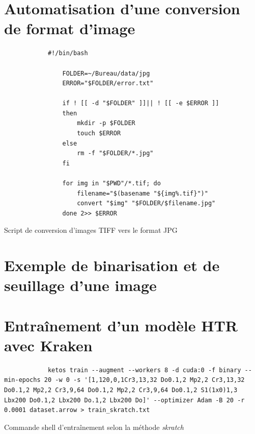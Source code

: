 \chapter{Automatisation d'une conversion de format d'image}
\begin{listing}
	        \begin{verbatim}
	        #!/bin/bash

                FOLDER=~/Bureau/data/jpg 
                ERROR="$FOLDER/error.txt"
                
                if ! [[ -d "$FOLDER" ]]|| ! [[ -e $ERROR ]]
                then
                	mkdir -p $FOLDER
                	touch $ERROR
                else
                    rm -f "$FOLDER/*.jpg"
                fi
                
                for img in "$PWD"/*.tif; do 
                    filename="$(basename "${img%.tif}")"
                    convert "$img" "$FOLDER/$filename.jpg"
                done 2>> $ERROR
	        \end{verbatim}
        	\caption{Script de conversion d'images TIFF vers le format JPG}
        	\label{code:shell_img}
\end{listing}

\chapter{Exemple de binarisation et de seuillage d'une image}
\chaptermark{}


\chapter{Entraînement d'un modèle HTR avec Kraken}

\begin{listing}[h]
\centering
	        \begin{verbatim}
	        ketos train --augment --workers 8 -d cuda:0 -f binary --min-epochs 20 -w 0 -s '[1,120,0,1Cr3,13,32 Do0.1,2 Mp2,2 Cr3,13,32 Do0.1,2 Mp2,2 Cr3,9,64 Do0.1,2 Mp2,2 Cr3,9,64 Do0.1,2 S1(1x0)1,3 Lbx200 Do0.1,2 Lbx200 Do.1,2 Lbx200 Do]' --optimizer Adam -B 20 -r 0.0001 dataset.arrow > train_skratch.txt
	        \end{verbatim}
        	\caption{Commande shell d'entraînement selon la méthode \textit{skratch}}
        	\label{code:skratch}
\end{listing}

